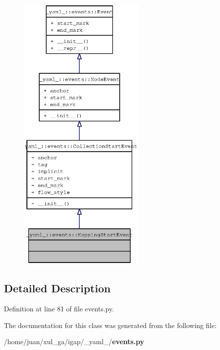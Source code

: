 \begin{figure}[H]
\begin{center}
\leavevmode
\includegraphics[height=400pt]{class__yaml___1_1events_1_1MappingStartEvent__coll__graph}
\end{center}
\end{figure}


\subsection{Detailed Description}


Definition at line 81 of file events.py.

The documentation for this class was generated from the following file:\begin{CompactItemize}
\item 
/home/juan/xul\_\-ga/igap/\_\-yaml\_\-/{\bf events.py}\end{CompactItemize}
